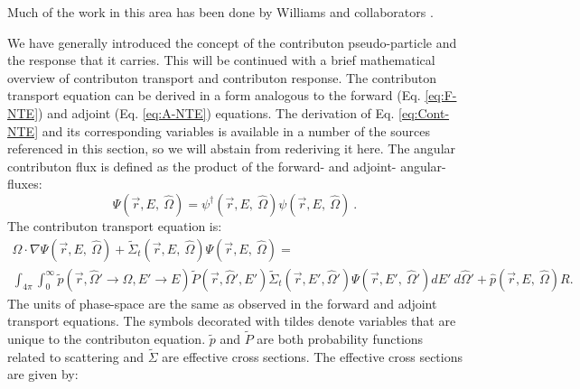 Much of the work in this area has been done
by Williams and collaborators
\cite{williams_generalized_1991,williams_contributorn_1992,williams_contributon_study}.

We have generally introduced the concept of the contributon pseudo-particle and
the response that it carries. This will be continued with a brief mathematical
overview of contributon transport and contributon response.
The contributon transport equation can be derived in a form analogous
to the forward (Eq. \ref{eq:F-NTE}) and adjoint (Eq. \ref{eq:A-NTE}) equations.
The derivation of Eq. \ref{eq:Cont-NTE} and its corresponding variables is
available in a number of the sources referenced in this section, so we will
abstain from rederiving it here.
The angular contributon flux is defined
as the product of the forward- and
adjoint- angular- fluxes:
\begin{equation}
\Psi (\vec {r} ,E,\:\hat\Omega) = \psi^{\dagger} (\vec {r} ,E,\:\hat\Omega)
        \psi(\vec {r} ,E,\:\hat\Omega)\:.
\label{eq.Cont-Flux}
\end{equation}
The contributon transport equation is:
\begin{multline}
\hat\Omega \cdot \nabla \Psi (\vec {r} ,E,\:\hat\Omega)
+\widetilde{\Sigma} _{ t }(\vec{r},E,\:\hat\Omega)\Psi (\vec { r } ,E,\:\hat\Omega)
     = \\
        \int _{ 4\pi  } \int _{ 0 }^{ \infty  }
        \widetilde{p}(\vec{r}, \hat\Omega'\rightarrow\hat\Omega, E'\rightarrow E)
        \widetilde{P}(\vec{r}, \hat\Omega',E')
        \widetilde{\Sigma} _{ t }(\vec{r}, E', \hat\Omega')
        \Psi (\vec { r } ,E',\: \hat\Omega')dE' \:d\hat\Omega'
        + \hat p(\vec { r } ,E, \:\hat\Omega) R .
\label{eq:Cont-NTE}
\end{multline}
The units of phase-space are the same as observed in the forward and adjoint
transport equations. The symbols decorated with tildes denote variables that are
unique to the contributon equation. $\widetilde{p}$ and $\widetilde{P}$ are both
probability functions related to scattering and $\widetilde{\Sigma}$ are
effective cross sections.
The effective cross sections are given by:
